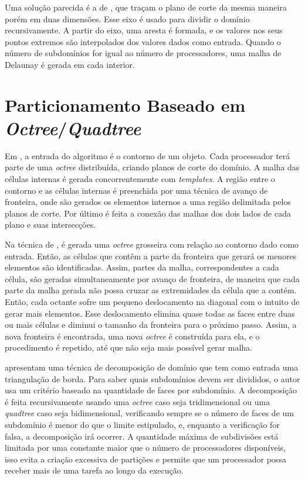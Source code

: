 Uma solução parecida é a de \cite{bib:Lammer00}, que traçam o plano de corte da mesma maneira porém em duas dimensões. Esse eixo é usado para dividir o domínio recursivamente. A partir do eixo, uma aresta é formada, e os valores nos seus pontos extremos são interpolados dos valores dados como entrada. Quando o número de subdomínios for igual ao número de processadores, uma malha de Delaunay é gerada em cada interior.

\section{Particionamento Baseado em \textit{Octree}/\textit{Quadtree}}

Em \cite{bib:deCougny99}, a entrada do algoritmo é o contorno de um objeto. Cada processador terá parte de uma \textit{octree} distribuída, criando planos de corte do domínio. A malha das células internas é gerada concorrentemente com \textit{templates}. A região entre o contorno e as células internas é preenchida por uma técnica de avanço de fronteira, onde são gerados os elementos internos a uma região delimitada pelos planos de corte. Por último é feita a conexão das malhas dos dois lados de cada plano e suas intersecções.

Na técnica de \cite{bib:Lohner01}, é gerada uma \textit{octree} grosseira com relação ao contorno dado como entrada. Então, as células que contêm a parte da fronteira que gerará os menores elementos são identificadas. Assim, partes da malha, correspondentes a cada célula, são geradas simultaneamente por avanço de fronteira, de maneira que cada parte da malha gerada não possa cruzar as extremidades da célula que a contém. Então, cada octante sofre um pequeno deslocamento na diagonal com o intuito de gerar mais elementos. Esse deslocamento elimina quase todas as faces entre duas ou mais células e diminui o tamanho da fronteira para o próximo passo. Assim, a nova fronteira é encontrada, uma nova \textit{octree} é construída para ela, e o procedimento é repetido, até que não seja mais possível gerar malha.

\cite{bib:Larwood03} apresentam uma técnica de decomposição de domínio que tem como entrada uma triangulação de borda. Para saber quais subdomínios devem ser divididos, o autor usa um critério baseado na quantidade de faces por subdomínio. A decomposição é feita recursivamente usando uma \textit{octree} caso seja tridimensional ou uma \textit{quadtree} caso seja bidimensional, verificando sempre se o número de faces de um subdomínio é menor do que o limite estipulado, e, enquanto a verificação for falsa, a decomposição irá ocorrer. A quantidade máxima de subdivisões está limitada por uma constante maior que o número de processadores disponíveis, isso evita a criação excessiva de partições e permite que um processador possa receber mais de uma tarefa ao longo da execução.

